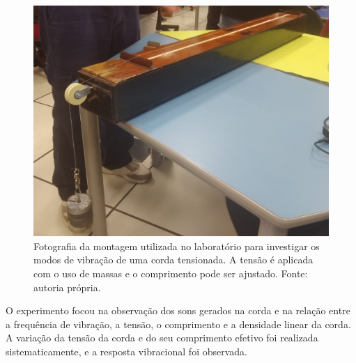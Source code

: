 \begin{figure}[H]
    \centering
    \includegraphics[width=0.35\linewidth]{fig/umacorda.png.jpg}
    \caption{Fotografia da montagem utilizada no laboratório para investigar os modos de vibração de uma corda tensionada. A tensão é aplicada com o uso de massas e o comprimento pode ser ajustado. Fonte: autoria própria.}
    \label{fig:umacorda}
\end{figure}

O experimento focou na observação dos sons gerados na corda e na relação entre a frequência de vibração, a tensão, o comprimento e a densidade linear da corda. A variação da tensão da corda e do seu comprimento efetivo foi realizada sistematicamente, e a resposta vibracional foi observada.